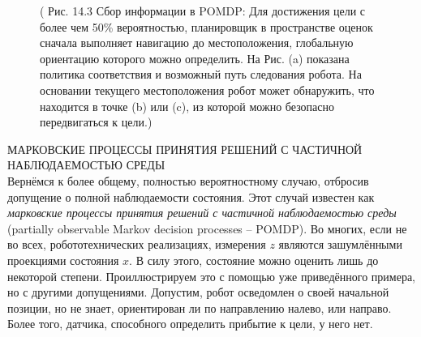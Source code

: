 \documentclass[10pt,a4paper]{article}
\begin{document}
\begin{figure}[H]
	\caption{ ( Рис. 14.3 Сбор информации в POMDP: Для достижения цели с более чем 50\% вероятностью, планировщик в пространстве оценок сначала выполняет навигацию до местоположения, глобальную ориентацию которого можно определить. На Рис. (a) показана политика соответствия и возможный путь следования робота. На основании текущего местоположения робот может обнаружить, что находится в точке (b) или (c), из которой можно безопасно передвигаться к цели.) }
	\label{fig:143orig}
\end{figure}

МАРКОВСКИЕ ПРОЦЕССЫ ПРИНЯТИЯ РЕШЕНИЙ С ЧАСТИЧНОЙ НАБЛЮДАЕМОСТЬЮ СРЕДЫ\\

Вернёмся к более общему, полностью вероятностному случаю, отбросив допущение о полной наблюдаемости состояния. Этот случай известен как \textit{марковские процессы принятия решений с частичной наблюдаемостью среды} (partially observable Markov decision processes – POMDP). Во многих, если не во всех, робототехнических реализациях, измерения $z$ являются зашумлёнными проекциями состояния $x$. В силу этого, состояние можно оценить лишь до некоторой степени. Проиллюстрируем это с помощью уже приведённого примера, но с другими допущениями. Допустим, робот осведомлен о своей начальной позиции, но не знает, ориентирован ли по направлению налево, или направо. Более того, датчика, способного определить прибытие к цели, у него нет.
\end{document}
